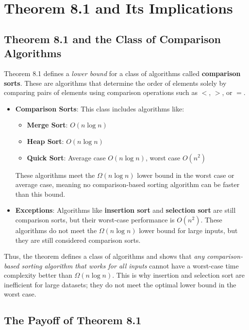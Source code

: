 \documentclass{article}
\begin{document}
\section{Theorem 8.1 and Its Implications}

\subsection{Theorem 8.1 and the Class of Comparison Algorithms}
Theorem 8.1 defines a \textit{lower bound} for a class of algorithms called \textbf{comparison sorts}. These are algorithms that determine the order of elements solely by comparing pairs of elements using comparison operations such as \( < \), \( > \), or \( = \).

\begin{itemize}
    \item \textbf{Comparison Sorts}: This class includes algorithms like:
        \begin{itemize}
            \item \textbf{Merge Sort}: \( O(n \log n) \)
            \item \textbf{Heap Sort}: \( O(n \log n) \)
            \item \textbf{Quick Sort}: Average case \( O(n \log n) \), worst case \( O(n^2) \)
        \end{itemize}
        These algorithms meet the \( \Omega(n \log n) \) lower bound in the worst case or average case, meaning no comparison-based sorting algorithm can be faster than this bound.
    \item \textbf{Exceptions}: Algorithms like \textbf{insertion sort} and \textbf{selection sort} are still comparison sorts, but their worst-case performance is \( O(n^2) \). These algorithms do not meet the \( \Omega(n \log n) \) lower bound for large inputs, but they are still considered comparison sorts.
\end{itemize}

Thus, the theorem defines a class of algorithms and shows that \textit{any comparison-based sorting algorithm that works for all inputs} cannot have a worst-case time complexity better than \( \Omega(n \log n) \). This is why insertion and selection sort are inefficient for large datasets; they do not meet the optimal lower bound in the worst case.

\subsection{The Payoff of Theorem 8.1}
\end{document}
